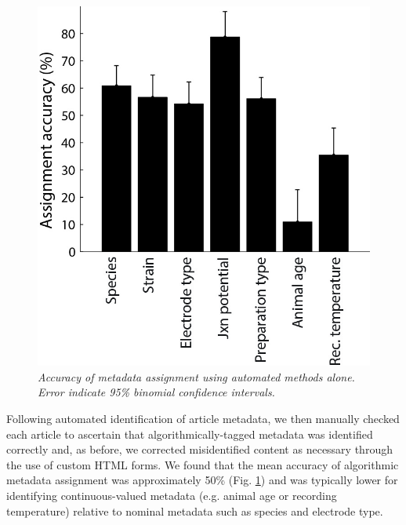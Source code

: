 \documentclass{template/frontiersSCNS} %
\begin{document}
\begin{figure}[htbp!]
\centering
\includegraphics[scale = .25]{figures/metadata_assignment_accuracy_v2.jpg}
\caption{\textit{Accuracy of metadata assignment using automated methods alone. Error indicate 95\% binomial confidence intervals.} }
\label{metadata_robot_accuracy_robot}
\end{figure}

Following automated identification of article metadata, we then manually checked each article to ascertain that algorithmically-tagged metadata was identified correctly and, as before, we corrected misidentified content as necessary through the use of custom HTML forms.  
We found that the mean accuracy of algorithmic metadata assignment was approximately 50\% (Fig. \ref{metadata_robot_accuracy_robot}) and was typically lower for identifying continuous-valued metadata (e.g. animal age or recording temperature) relative to nominal metadata such as species and electrode type.
\end{document}
